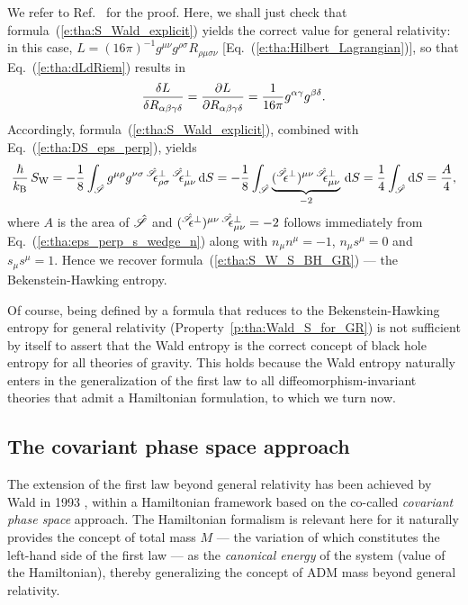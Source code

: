We refer to Ref.~\cite{IyerW94} for the proof.
Here, we shall just check that formula~(\ref{e:tha:S_Wald_explicit}) yields the
correct value for general relativity: in this case,
$L = (16\pi)^{-1} g^{\mu\nu} g^{\rho\sigma} R_{\rho\mu\sigma\nu}$
[Eq.~(\ref{e:tha:Hilbert_Lagrangian})], so that Eq.~(\ref{e:tha:dLdRiem}) results in
\[
    \frac{\delta L}{\delta R_{\alpha\beta\gamma\delta}} = \frac{\partial L}{\partial R_{\alpha\beta\gamma\delta}}
    = \frac{1}{16\pi} g^{\alpha\gamma} g^{\beta\delta} .
\]
Accordingly, formula~(\ref{e:tha:S_Wald_explicit}), combined with Eq.~(\ref{e:tha:DS_eps_perp}), yields
\[
    \frac{\hbar}{k_{\rm  B}} \, S_{\rm W}  = -\frac{1}{8} \int_{\hat{\Sp}} g^{\mu\rho} g^{\nu\sigma} \,
    {}^{\hat{\Sp}}\!\!\eps^\perp_{\rho\sigma} \, {}^{\hat{\Sp}}\!\!\eps^\perp_{\mu\nu} \,
    \D S
    = - \frac{1}{8} \int_{\hat{\Sp}}
    \underbrace{({}^{\hat{\Sp}}\!\!\eps^\perp)^{\mu\nu} \, {}^{\hat{\Sp}}\!\!\eps^\perp_{\mu\nu}}_{-2} \,  \D S
    = \frac{1}{4} \int_{\hat{\Sp}} \D S  = \frac{A}{4} ,
\]
where $A$ is the area of $\hat{\mathscr{S}}$ and $({}^{\hat{\mathscr{S}}}\!\!\epsilon^\perp)^{\mu\nu} \, {}^{\hat{\mathscr{S}}}\!\!\epsilon^\perp_{\mu\nu}=-2$
follows immediately from Eq.~(\ref{e:tha:eps_perp_s_wedge_n}) along with
$n_\mu n^\mu = -1$, $n_\mu s^\mu = 0$ and $s_\mu s^\mu = 1$.
Hence we recover formula~(\ref{e:tha:S_W_S_BH_GR}) --- the Bekenstein-Hawking entropy.


Of course, being defined by a formula that reduces to the Bekenstein-Hawking entropy
for general relativity (Property~\ref{p:tha:Wald_S_for_GR})
is not sufficient by itself to assert that the Wald entropy
is the correct concept of black hole entropy for all theories
of gravity. This holds because the Wald entropy naturally enters in the
generalization of the first law to all diffeomorphism-invariant theories
that admit a Hamiltonian formulation, to which we turn now.

\subsection{The covariant phase space approach}

The extension of the first law beyond general relativity has been achieved
by Wald in 1993 \cite{Wald93}, within a Hamiltonian
framework based on the co-called \emph{covariant phase space} approach. The Hamiltonian formalism is relevant here for it naturally provides the concept
of total mass $M$ --- the variation of which constitutes the left-hand side of the first law --- as the \emph{canonical energy} of the system (value of the Hamiltonian),
thereby generalizing the concept of ADM mass beyond general relativity.

